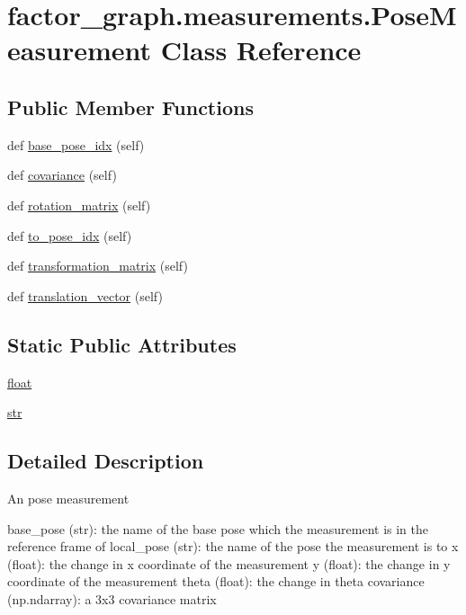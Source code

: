 \hypertarget{classfactor__graph_1_1measurements_1_1PoseMeasurement}{}\section{factor\+\_\+graph.\+measurements.\+Pose\+Measurement Class Reference}
\label{classfactor__graph_1_1measurements_1_1PoseMeasurement}
\subsection*{Public Member Functions}
\begin{DoxyCompactItemize}
\item
def \hyperlink{classfactor__graph_1_1measurements_1_1PoseMeasurement_acc30dcc13980360b440098b45a20de01}{base\+\_\+pose\+\_\+idx} (self)
\item
def \hyperlink{classfactor__graph_1_1measurements_1_1PoseMeasurement_aef05f23a7d7e4f7e53358b4ae32d113a}{covariance} (self)
\item
def \hyperlink{classfactor__graph_1_1measurements_1_1PoseMeasurement_a8335e1a152a40280a937b0414c8d5c95}{rotation\+\_\+matrix} (self)
\item
def \hyperlink{classfactor__graph_1_1measurements_1_1PoseMeasurement_a6cbb9552418f41c807c7bd5f2bdf87db}{to\+\_\+pose\+\_\+idx} (self)
\item
def \hyperlink{classfactor__graph_1_1measurements_1_1PoseMeasurement_aabc57f4b800ae1602a9271f09c618b23}{transformation\+\_\+matrix} (self)
\item
def \hyperlink{classfactor__graph_1_1measurements_1_1PoseMeasurement_aa8a3a9af196a3dcd9ef80cb7c3830750}{translation\+\_\+vector} (self)
\end{DoxyCompactItemize}
\subsection*{Static Public Attributes}
\begin{DoxyCompactItemize}
\item
\hyperlink{classfactor__graph_1_1measurements_1_1PoseMeasurement_a1cae3818fb223706bca90c8b6690ce91}{float}
\item
\hyperlink{classfactor__graph_1_1measurements_1_1PoseMeasurement_a1660d5b6ea2c94a8f583ecb90b0d4c76}{str}
\end{DoxyCompactItemize}


\subsection{Detailed Description}
\begin{DoxyVerb}An pose measurement

base_pose (str): the name of the base pose which the measurement is in the
    reference frame of
local_pose (str): the name of the pose the measurement is to
x (float): the change in x coordinate of the measurement
y (float): the change in y coordinate of the measurement
theta (float): the change in theta
covariance (np.ndarray): a 3x3 covariance matrix
\end{DoxyVerb}



